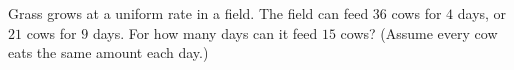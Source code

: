 Grass grows at a uniform rate in a field. The field can feed $36$ cows for $4$ days, or $21$ cows for $9$ days. For how many days can it feed $15$ cows? (Assume every cow eats the same amount each day.)

